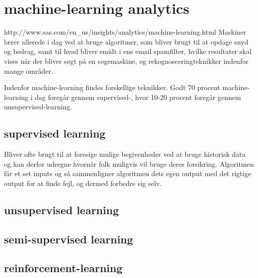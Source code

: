 \documentclass[12pt,hidelinks]{article}
\begin{document}
	\section{machine-learning analytics}
	http://www.sas.com/en\_us/insights/analytics/machine-learning.html
	Maskiner lærer allerede i dag ved at bruge algoritmer, som bliver brugt til at opdage snyd og bedrag, samt til hvad bliver smidt i ens email spamfilter, hvilke resultater skal vises når der bliver søgt på en søgemaskine, og rekognosceringteknikker indenfor mange områder.
	
	Indenfor machine-learning findes forskellige teknikker.
	Godt 70 procent machine-learning i dag foregår gennem supervised-, hvor 10-20 procent foregår gennem unsupervised-learning.
	\subsection{supervised learning}
	Bliver ofte brugt til at foresige mulige begivenheder ved at bruge historisk data og kan derfor udregne hvornår folk muligvis vil bruge deres forsikring. Algoritmen får et set inputs og så sammenligner algoritmen dets egen output med det rigtige output for at finde fejl, og dermed forbedre sig selv.
	\subsection{unsupervised learning}
	\subsection{semi-supervised learning}
	\subsection{reinforcement-learning}
\end{document}
